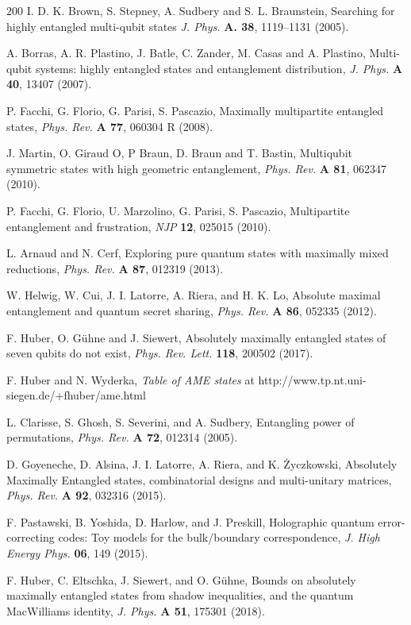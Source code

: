 \documentclass[english,aps,pra,nofootinbib,twocolumn,superscriptaddress]{revtex4-1}
\newcommand{\1}{{\rm 1\hspace{-0.9mm}l}}
\begin{document}
\begin{thebibliography}{200}
 I. D. K. Brown, S. Stepney, A. Sudbery and S. L. Braunstein,
Searching for highly entangled multi-qubit states
{\sl J. Phys.} {\bf A. 38}, 1119--1131 (2005).

 A. Borras, A. R. Plastino, J. Batle, C. Zander, M. Casas
 and A. Plastino,
Multi-qubit systems: highly entangled states and entanglement distribution,
{\sl J. Phys.} {\bf  A 40}, 13407 (2007).

  P. Facchi, G. Florio, G. Parisi, S. Pascazio,
 Maximally multipartite entangled states,
{\sl  Phys. Rev.} {\bf A 77}, 060304 R (2008).

 J. Martin, O. Giraud O, P Braun,  D. Braun and T. Bastin,
 Multiqubit symmetric states with high geometric entanglement,
{\sl  Phys. Rev.} {\bf A 81},  062347 (2010).

 P. Facchi, G. Florio, U. Marzolino, G. Parisi, S. Pascazio,
Multipartite entanglement and frustration,
{\sl NJP} {\bf 12}, 025015 (2010).

 L. Arnaud and N. Cerf,
 Exploring pure quantum states with maximally mixed reductions,
 {\sl Phys. Rev.} {\bf  A 87}, 012319 (2013).

W. Helwig, W. Cui, J. I. Latorre, A. Riera, and H. K. Lo,
Absolute maximal entanglement and quantum secret sharing, 
{\sl Phys. Rev.} {\bf A 86}, 052335 (2012).

  F. Huber, O. G{\"u}hne and J. Siewert,
Absolutely maximally entangled states of seven qubits do not exist,
{\sl Phys. Rev. Lett.} {\bf  118}, 200502  (2017).

 F. Huber and N. Wyderka, {\sl Table of AME states} at 
  http://www.tp.nt.uni-siegen.de/+fhuber/ame.html 

 L. Clarisse, S. Ghosh, S. Severini, and A. Sudbery, 
Entangling power of permutations, 
{\sl Phys. Rev.} {\bf  A 72}, 012314 (2005).

 D. Goyeneche, D. Alsina, J. I. Latorre, A. Riera, and K. {\.Z}yczkowski,
Absolutely Maximally Entangled states, combinatorial designs and multi-unitary matrices,
{\sl Phys. Rev.} {\bf A 92}, 032316 (2015).

 F. Pastawski, B. Yoshida, D. Harlow, and J. Preskill, 
Holographic quantum error-correcting codes: Toy models for the
bulk/boundary correspondence, 
{\sl J. High Energy Phys.}  {\bf 06}, 149 (2015).

 F. Huber, C. Eltschka, J. Siewert, and O. G{\"u}hne, 
Bounds on absolutely maximally entangled states from shadow 
inequalities, and the quantum MacWilliams identity, 
{\sl J. Phys.} {\bf  A 51}, 175301 (2018).


\end{thebibliography}
\end{document}
